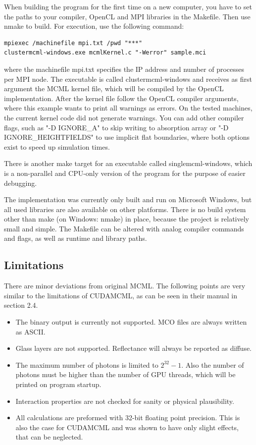 \documentclass[]{article}
\begin{document}
When building the program for the first time on a new computer, you have to set the paths to your compiler, OpenCL and MPI libraries in the Makefile. Then use nmake to build. For execution, use the following command:

\begin{lstlisting}
mpiexec /machinefile mpi.txt /pwd "***"
clustermcml-windows.exe mcmlKernel.c "-Werror" sample.mci
\end{lstlisting}

where the machinefile mpi.txt specifies the IP address and number of processes per MPI node. The executable is called clustermcml-windows and receives as first argument the MCML kernel file, which will be compiled by the OpenCL implementation. After the kernel file follow the OpenCL compiler arguments, where this example wants to print all warnings as errors. On the tested machines, the current kernel code did not generate warnings. You can add other compiler flags, such as "-D IGNORE\_A" to skip writing to absorption array or "-D IGNORE\_HEIGHTFIELDS" to use implicit flat boundaries, where both options exist to speed up simulation times.

There is another make target for an executable called singlemcml-windows, which is a non-parallel and CPU-only version of the program for the purpose of easier debugging.

The implementation was currently only built and run on Microsoft Windows, but all used libraries are also available on other platforms. There is no build system other than make (on Windows: nmake) in place, because the project is relatively small and simple. The Makefile can be altered with analog compiler commands and flags, as well as runtime and library paths.

\subsection{Limitations}

There are minor deviations from original MCML. The following points are very similar to the limitations of CUDAMCML, as can be seen in their manual in section 2.4.

\begin{itemize}
\item The binary output is currently not supported. MCO files are always written as ASCII.

\item Glass layers are not supported. Reflectance will always be reported as diffuse.

\item The maximum number of photons is limited to $2^{32}-1$. Also the number of photons must be higher than the number of GPU threads, which will be printed on program startup.

\item Interaction properties are not checked for sanity or physical plausibility.

\item All calculations are preformed with 32-bit floating point precision. This is also the case for CUDAMCML and was shown to have only slight effects, that can be neglected.
\end{itemize}
\end{document}
